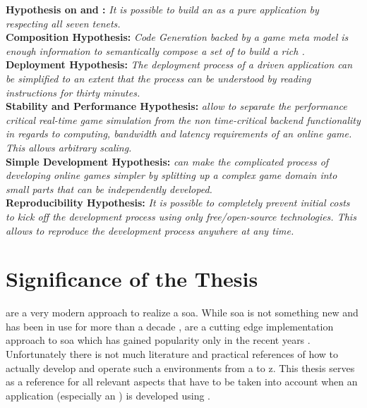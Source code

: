 \noindent\textbf{Hypothesis on \ogsucuc{} and \mssuc{}:}
\textit{It is possible to build an \og{} as a pure \ms{} application by
respecting all seven \ms{} tenets.}\\

\noindent\textbf{Composition Hypothesis:}
\textit{Code Generation backed by a game meta model is enough information to
semantically compose a set of \mss{} to build a rich \og{}.}\\

\noindent\textbf{Deployment Hypothesis:} 
\textit{The deployment process of a \ms{} driven \og{} application can be
simplified to an extent that the process can be understood by reading
instructions for thirty minutes.}\\

\noindent\textbf{Stability and Performance Hypothesis:} 
\textit{\mssuc{} allow to separate the performance critical real-time game
simulation from the non time-critical backend functionality in regards to
computing, bandwidth and latency requirements of an online game. This allows
arbitrary scaling.}\\

\noindent\textbf{Simple Development Hypothesis:} 
\textit{\mssuc{} can make the complicated process of developing online games
simpler by splitting up a complex game domain into small parts that can be independently
developed.}\\

\noindent\textbf{Reproducibility Hypothesis:} 
\textit{It is possible to completely prevent initial costs to kick off the
development process using only free/open-source technologies. This allows to reproduce the
development process anywhere at any time.}

\section{Significance of the Thesis}

\mssuc{} are a very modern approach to realize a \gls{soa}. While \gls{soa} is
not something new and has been in use for more than a decade \cite{josuttis2007soa},
\mss{} are a cutting edge implementation approach to \gls{soa} which has gained
popularity only in the recent years \cite{rajeev2016ms_popular}. Unfortunately
there is not much literature and practical references of how to actually develop
and operate such a \ms{} environments from a to z. This thesis serves as a
reference for all relevant aspects that have to be taken into account when an
application (especially an \og{}) is developed using \mss{}.

